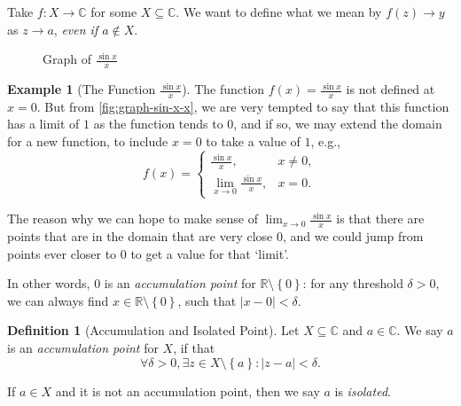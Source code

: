 \documentclass[11pt]{article}
\numberwithin{equation}{section}
\theoremstyle{definition}
\newtheorem{definition}[theorem]{Definition}
\newtheorem{example}[theorem]{Example}
\theoremstyle{remark}
\newcommand{\pqty}[1]{\left(#1\right)}
\newcommand{\Bqty}[1]{\left\{#1\right\}}
\newcommand{\abs}[1]{\left|#1\right|}
\newcommand{\functiondomain}[3]{#1:#2\to #3}
\newcommand{\RR}{\mathbb R}
\newcommand{\CC}{\mathbb C}
\begin{document}
Take \(\functiondomain{f}{X}{\CC}\) for some \(X \subseteq \CC\). We want to define what we mean by \(f\pqty{z} \to y\) as \(z \to a\), \emph{even if \(a \notin X\)}.

\begin{figure}[ht!]
    \centering
    \caption{Graph of \(\frac{\sin x}{x}\)}
    \label{fig:graph-sin-x-x}
\end{figure}

\begin{example}[The Function \(\frac{\sin x}{x}\)]\label{analysis-unit-0068}
    The function \(f\pqty{x} = \frac{\sin x}{x}\) is not defined at \(x = 0\). But from \autoref{fig:graph-sin-x-x}, we are very tempted to say that this function has a limit of \(1\) as the function tends to \(0\), and if so, we may extend the domain for a new function, to include \(x = 0\) to take a value of \(1\), e.g.,
    \[
        f\pqty{x} = \begin{cases}
            \frac{\sin x}{x}, & x \neq 0, \\
            \lim_{x \to 0} \frac{\sin x}{x}, & x = 0.
        \end{cases}
    \]
\end{example}

The reason why we can hope to make sense of \(\lim_{x \to 0} \frac{\sin x}{x}\) is that there are points that are in the domain that are very close \(0\), and we could jump from points ever closer to \(0\) to get a value for that `limit'.

In other words, \(0\) is an \emph{accumulation point} for \(\RR \setminus \Bqty{0}\): for any threshold \(\delta > 0\), we can always find \(x \in \RR \setminus \Bqty{0}\), such that \(\abs{x - 0} < \delta\).

\begin{definition}[Accumulation and Isolated Point]\label{analysis-unit-0069}
    \label{def:fn-accumulation-isolated-point}%
    Let \(X \subseteq \CC\) and \(a \in \CC\). We say \(a\) is an \emph{accumulation point} for \(X\), if that
    \[
        \forall \delta > 0, \exists z \in X \setminus \Bqty{a}: \abs{z - a} < \delta.
    \]

    If \(a \in X\) and it is not an accumulation point, then we say \(a\) is \emph{isolated}.
\end{definition}
\end{document}
